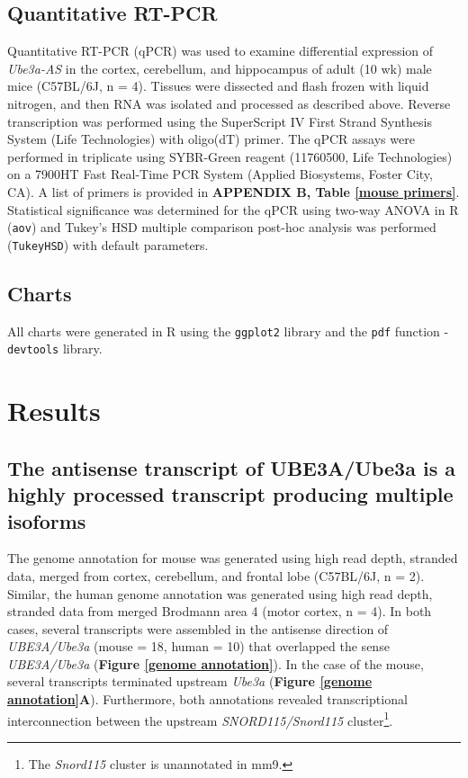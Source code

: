 \subsection{Quantitative RT-PCR}
Quantitative RT-PCR (qPCR) was used to examine differential expression of \textit{Ube3a-AS} in the cortex, cerebellum, and hippocampus of adult (10 wk) male mice (C57BL/6J, n = 4).  Tissues were dissected and flash frozen with liquid nitrogen, and then RNA was isolated and processed as described above. Reverse transcription was performed using the SuperScript IV First Strand Synthesis System (Life Technologies) with oligo(dT) primer. The qPCR assays were performed in triplicate using SYBR-Green reagent (11760500, Life Technologies) on a 7900HT Fast Real-Time PCR System (Applied Biosystems, Foster City, CA). A list of primers is provided in \textbf{APPENDIX B, Table \ref{mouse primers}}. Statistical significance was determined for the qPCR using two-way ANOVA in R (\texttt{aov}) and Tukey's HSD multiple comparison post-hoc analysis was performed (\texttt{TukeyHSD}) with default parameters.

\subsection{Charts}
All charts were generated in R using the \texttt{ggplot2} library and the \texttt{pdf} function - \texttt{devtools} library.

\section{Results}

\subsection{The antisense transcript of UBE3A/Ube3a is a highly processed transcript producing multiple isoforms}
The genome annotation for mouse was generated using high read depth, stranded data, merged from cortex, cerebellum, and frontal lobe (C57BL/6J, n = 2). Similar, the human genome annotation was generated using high read depth, stranded data from merged Brodmann area 4 (motor cortex, n = 4). In both cases, several transcripts were assembled in the antisense direction of \textit{UBE3A/Ube3a} (mouse = 18, human = 10) that overlapped the sense \textit{UBE3A/Ube3a} (\textbf{Figure \ref{genome annotation}}). In the case of the mouse, several transcripts terminated upstream \textit{Ube3a} (\textbf{Figure \ref{genome annotation}A}). Furthermore, both annotations revealed transcriptional interconnection between the upstream \textit{SNORD115/Snord115} cluster\footnote{The \textit{Snord115} cluster is unannotated in mm9.}.

